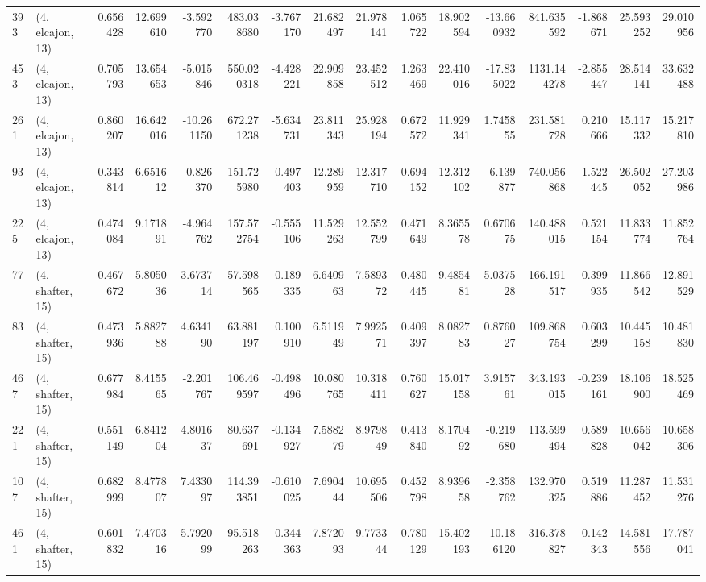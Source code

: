 \begin{tabular}{llrrrrrrrrrrrrrr}
393 &  (4, elcajon, 13) &   0.656428 &  12.699610 &  -3.592770 &   483.038680 &  -3.767170 &  21.682497 &  21.978141 &  1.065722 &  18.902594 & -13.660932 &   841.635592 & -1.868671 &  25.593252 &  29.010956 \\
453 &  (4, elcajon, 13) &   0.705793 &  13.654653 &  -5.015846 &   550.020318 &  -4.428221 &  22.909858 &  23.452512 &  1.263469 &  22.410016 & -17.835022 &  1131.144278 & -2.855447 &  28.514141 &  33.632488 \\
261 &  (4, elcajon, 13) &   0.860207 &  16.642016 & -10.261150 &   672.271238 &  -5.634731 &  23.811343 &  25.928194 &  0.672572 &  11.929341 &   1.745855 &   231.581728 &  0.210666 &  15.117332 &  15.217810 \\
93  &  (4, elcajon, 13) &   0.343814 &   6.651612 &  -0.826370 &   151.725980 &  -0.497403 &  12.289959 &  12.317710 &  0.694152 &  12.312102 &  -6.139877 &   740.056868 & -1.522445 &  26.502052 &  27.203986 \\
225 &  (4, elcajon, 13) &   0.474084 &   9.171891 &  -4.964762 &   157.572754 &  -0.555106 &  11.529263 &  12.552799 &  0.471649 &   8.365578 &   0.670675 &   140.488015 &  0.521154 &  11.833774 &  11.852764 \\
77  &  (4, shafter, 15) &   0.467672 &   5.805036 &   3.673714 &    57.598565 &   0.189335 &   6.640963 &   7.589372 &  0.480445 &   9.485481 &   5.037528 &   166.191517 &  0.399935 &  11.866542 &  12.891529 \\
83  &  (4, shafter, 15) &   0.473936 &   5.882788 &   4.634190 &    63.881197 &   0.100910 &   6.511949 &   7.992571 &  0.409397 &   8.082783 &   0.876027 &   109.868754 &  0.603299 &  10.445158 &  10.481830 \\
467 &  (4, shafter, 15) &   0.677984 &   8.415565 &  -2.201767 &   106.469597 &  -0.498496 &  10.080765 &  10.318411 &  0.760627 &  15.017158 &   3.915761 &   343.193015 & -0.239161 &  18.106900 &  18.525469 \\
221 &  (4, shafter, 15) &   0.551149 &   6.841204 &   4.801637 &    80.637691 &  -0.134927 &   7.588279 &   8.979849 &  0.413840 &   8.170492 &  -0.219680 &   113.599494 &  0.589828 &  10.656042 &  10.658306 \\
107 &  (4, shafter, 15) &   0.682999 &   8.477807 &   7.433097 &   114.393851 &  -0.610025 &   7.690444 &  10.695506 &  0.452798 &   8.939658 &  -2.358762 &   132.970325 &  0.519886 &  11.287452 &  11.531276 \\
461 &  (4, shafter, 15) &   0.601832 &   7.470316 &   5.792099 &    95.518263 &  -0.344363 &   7.872093 &   9.773344 &  0.780129 &  15.402193 & -10.186120 &   316.378827 & -0.142343 &  14.581556 &  17.787041 \\

\end{tabular}

